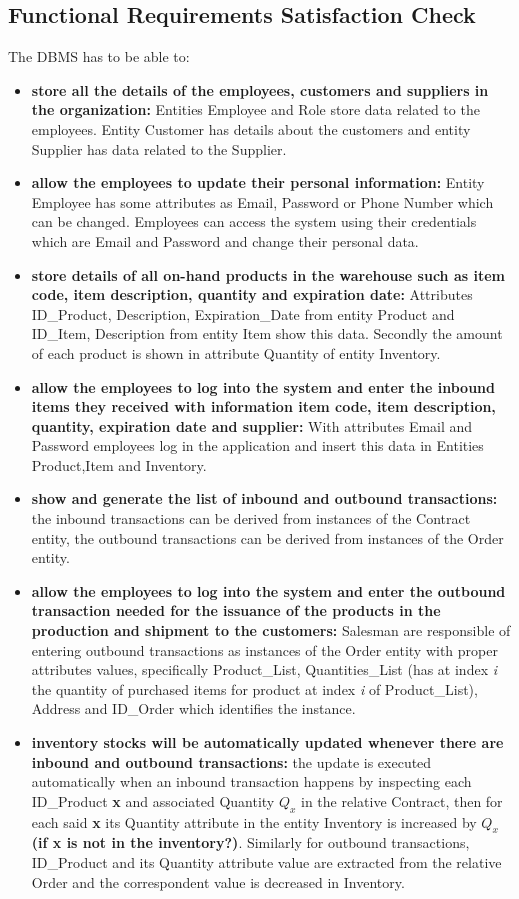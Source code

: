 \subsection{Functional Requirements Satisfaction Check}

The DBMS has to be able to:
\begin{itemize}
	\item \textbf{store all the details of the employees, customers and suppliers in the organization:} Entities Employee and Role store data related to the employees. Entity Customer has details about the customers and entity Supplier has data related to the Supplier.
	\item \textbf{allow the employees to update their personal information:} Entity Employee has some attributes as Email, Password or Phone Number which can be changed. Employees can access the system using their credentials which are Email and Password and change their personal data.
	\item \textbf{store details of all on-hand products in the warehouse such as item code, item description, quantity and expiration date:} Attributes ID\_Product, Description, Expiration\_Date from entity Product and ID\_Item, Description from entity Item show this data. Secondly the amount of each product is shown in attribute Quantity of entity Inventory.  
	\item \textbf{allow the employees to log into the system and enter the inbound items they received with information item code, item description, quantity, expiration date and supplier:} With attributes Email and Password employees log in the application and insert this data in Entities Product,Item and Inventory.
	\item \textbf{show and generate the list of inbound and outbound transactions:} the inbound transactions can be derived from instances of the Contract entity, the outbound transactions can be derived from instances of the Order entity.
	\item \textbf{allow the employees to log into the system and enter the outbound transaction needed for the issuance of the products in the production and shipment to the customers:} Salesman are responsible of entering outbound transactions as instances of the Order entity with proper attributes values, specifically Product\_List, Quantities\_List (has at index \textit{i} the quantity of purchased items for product at index \textit{i} of Product\_List), Address and ID\_Order which identifies the instance.
\item \textbf{inventory stocks will be automatically updated whenever there are inbound and outbound transactions:} the update is executed automatically when an inbound transaction happens by inspecting each ID\_Product \textbf{x} and associated Quantity \(Q_x\) in the relative Contract, then for each said \textbf{x} its Quantity attribute in the entity Inventory is increased by  \(Q_x\) \textbf{(if x is not in the inventory?)}. Similarly for outbound transactions, ID\_Product and its Quantity attribute value are extracted from the relative Order and the correspondent value is decreased in Inventory.

\end{itemize}
